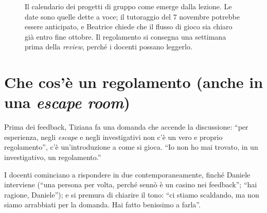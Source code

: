 \begin{figure}[htbp]
\centering
{}
\caption{Il calendario dei progetti di gruppo come emerge dalla lezione. Le date sono
quelle dette a voce; il tutoraggio del 7 novembre potrebbe essere anticipato, e Beatrice
chiede che il flusso di gioco sia chiaro già entro fine ottobre. Il regolamento si
consegna una settimana prima della \emph{review}, perché i docenti possano leggerlo.}
\label{a11:fig:calendario}
\end{figure}

\section{Che cos'è un regolamento (anche in una \emph{escape room})}
\label{a11:sec:regolamento}

Prima dei feedback, Tiziana fa una domanda che accende la discussione: ``per esperienza,
negli \emph{escape} e negli investigativi non c'è un vero e proprio regolamento'', c'è
un'introduzione a come si gioca. ``Io non ho mai trovato, in un investigativo, un
regolamento.''

I docenti cominciano a rispondere in due contemporaneamente, finché Daniele interviene
(``una persona per volta, perché sennò è un casino nei feedback''; ``hai ragione,
Daniele''); e si premura di chiarire il tono: ``ci stiamo scaldando, ma non siamo
arrabbiati per la domanda. Hai fatto benissimo a farla''.

